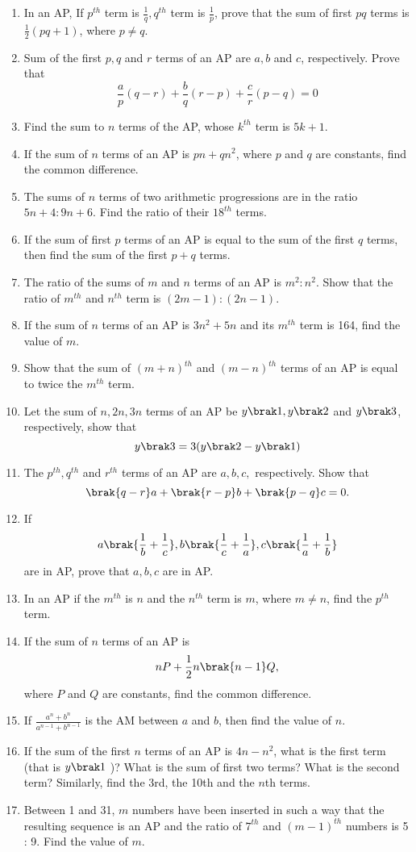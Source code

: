 \begin{enumerate}[label=\thesubsection.\arabic*, ref=\thesubsection.\theenumi]
\item In an AP,  If $p^{th}$ term is $\frac{1}{q}, q^{th}$ term is $\frac{1}{p}$,  prove that the sum of first $pq$ terms is $\frac{1}{2}(pq+1)$,  where $p \neq q.$
\item Sum of the first $p,  q$ and $r$ terms of an AP are $a,  b$ and $c$,  respectively. Prove that
$$\frac{a}{p}(q-r)+\frac{b}{q}(r-p)+\frac{c}{r}(p-q) = 0$$
\item Find the sum to $n$ terms of the AP,  whose $k^{th}$ term is $5k + 1$.
\item If the sum of $n$ terms of an AP is $pn + qn^2$,  where $p$ and $q$ are constants,  find the common difference.
\item The sums of $n$ terms of two arithmetic progressions are in the ratio $5n + 4 : 9n + 6$. Find the ratio of their $18^{th}$ terms.
\item If the sum of first $p$ terms of an AP is equal to the sum of the first $q$ terms,  then find the sum of the first $p + q$ terms.
\item The ratio of the sums of $m$ and $n$ terms of an AP is $m^2 : n^2$. Show that the ratio of 
$m^{th}$ and $n^{th}$ term is $(2m - 1) : (2n - 1)$.
\item If the sum of $n$ terms of an AP is $3n^2 + 5n$ and its $m^{th}$ term is 164,  find the value
of $m$.
\item Show that the sum of $(m + n)^{th}$ and $(m - n)^{th}$ terms of an AP is equal to twice the $m^{th}$ term.
\item Let the sum of $n,  2n,  3n$ terms of an AP be $y\brak 1,  y\brak 2$ and $y\brak 3$,  respectively,  show that 
$$y\brak 3 = 3(y\brak 2 - y\brak 1)$$
\item The $p^{th}, q^{th}$ and $r^{th}$ terms of an AP  are $a, b, c,$ respectively. Show that 
$$\brak {q - r }a + \brak {r - p }b + \brak {p - q }c = 0.$$
\item If $$a\brak {\frac{1}{b}+\frac{1}{c}}, b\brak {\frac{1}{c}+\frac{1}{a}}, c\brak {\frac{1}{a}+\frac{1}{b}}$$ are in AP, prove that $a, b, c$ are in AP. 
\item In an AP if the $m^{th}$ is $n$ and the $n^{th}$ term is $m$, where $m \ne n$, find the $p^{th}$ term.
\item If the sum of $n$ terms of an AP is
	$$nP+\frac{1}{2} n\brak {n-1}Q,$$
	where $P$ and $Q$ are constants, find the common difference.
\item If $\frac{a^n+b^n}{a^{n-1}+b^{n-1}}$ is the AM  between $a$ and $b$,  then find the value of $n$.
\item If the sum of the first $n$ terms of an AP is $4n - n^2$,  what is the first term (that is $y\brak 1$ )? What
is the sum of first two terms? What is the second term? Similarly,  find the 3rd,  the 10th and
the $n$th terms.
\item Between 1 and 31,  $m$ numbers have been inserted in such a way that the resulting sequence is an AP and the ratio of $7^{th}$ and $(m - 1)^{th}$ numbers is 5 : 9. Find the value of $m$.
\end{enumerate}

